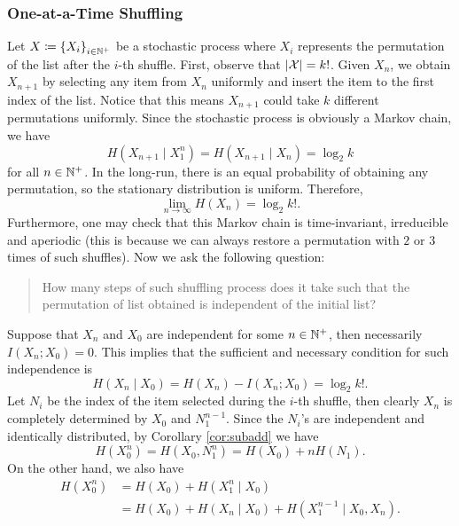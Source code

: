 \documentclass[math]{amznotes}
\theoremstyle{remark}
\begin{document}
\subsubsection{One-at-a-Time Shuffling}
Let $X \coloneqq \left\{X_i\right\}_{i \in \mathbb{N}^+}$ be a stochastic process where $X_i$ represents the permutation of the list after the $i$-th shuffle. First, observe that ${\left\lvert {\mathcal{X}} \right\rvert} = k!$. Given $X_n$, we obtain $X_{n + 1}$ by selecting any item from $X_n$ uniformly and insert the item to the first index of the list. Notice that this means $X_{n + 1}$ could take $k$ different permutations uniformly. Since the stochastic process is obviously a Markov chain, we have
\begin{equation*}
    H\left(X_{n + 1} \mid X_1^n\right) = H\left(X_{n + 1} \mid X_n\right) = \log_2 k
\end{equation*}
for all $n \in \mathbb{N}^+$. In the long-run, there is an equal probability of obtaining any permutation, so the stationary distribution is uniform. Therefore,
\begin{equation*}
    \lim_{n \to \infty}H\left(X_n\right) = \log_2 k!.
\end{equation*}
Furthermore, one may check that this Markov chain is time-invariant, irreducible and aperiodic (this is because we can always restore a permutation with $2$ or $3$ times of such shuffles). Now we ask the following question:
\begin{quote}
    How many steps of such shuffling process does it take such that the permutation of list obtained is independent of the initial list?
\end{quote}
Suppose that $X_n$ and $X_0$ are independent for some $n \in \mathbb{N}^+$, then necessarily $I\left(X_n ; X_0\right) = 0$. This implies that the sufficient and necessary condition for such independence is 
\begin{equation*}
    H\left(X_n \mid X_0\right) = H\left(X_n\right) - I\left(X_n ; X_0\right) = \log_2 k!.
\end{equation*}
Let $N_i$ be the index of the item selected during the $i$-th shuffle, then clearly $X_n$ is completely determined by $X_0$ and $N_1^{n - 1}$. Since the $N_i$'s are independent and identically distributed, by Corollary \ref{cor:subadd} we have
\begin{equation*}
    H\left(X_0^n\right) = H\left(X_0, N_1^{n}\right) = H\left(X_0\right) + nH\left(N_1\right).
\end{equation*}
On the other hand, we also have 
\begin{align*}
    H\left(X_0^n\right) & = H\left(X_0\right) + H\left(X_1^n \mid X_0\right) \\
    & = H\left(X_0\right) + H\left(X_n \mid X_0\right) + H\left(X_1^{n - 1} \mid X_0, X_n\right).
\end{align*}
\end{document}

